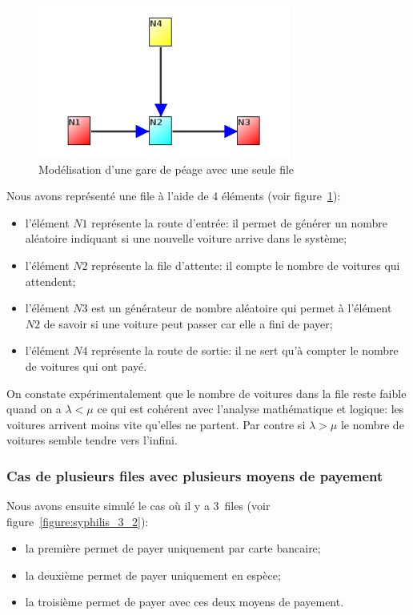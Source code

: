 \documentclass{scrartcl}
\begin{document}
      \begin{figure}[htbp]
        \centering
        \includegraphics[height=5cm]{img/poisson_simple.png}
        \caption{Modélisation d'une gare de péage avec une seule file}
        \label{figure:syphilis_simple}
      \end{figure}

      Nous avons représenté une file à l'aide de 4 éléments (voir
      figure~\ref{figure:syphilis_simple}):
      \begin{itemize}
        \item l'élément $N1$ représente la route d'entrée: il permet de générer
          un nombre aléatoire indiquant si une nouvelle voiture arrive dans le
          système;
        \item l'élément $N2$ représente la file d'attente: il compte le nombre
          de voitures qui attendent;
        \item l'élément $N3$ est un générateur de nombre aléatoire qui permet à
          l'élément $N2$ de savoir si une voiture peut passer car elle a fini
          de payer;
        \item l'élément $N4$ représente la route de sortie: il ne sert qu'à
          compter le nombre de voitures qui ont payé.
      \end{itemize}

      On constate expérimentalement que le nombre de voitures dans la file
      reste faible quand on a $\lambda < \mu$ ce qui est cohérent avec
      l'analyse mathématique et logique: les voitures arrivent moins vite
      qu'elles ne partent. Par contre si $\lambda > \mu$ le nombre de voitures
      semble tendre vers l'infini.

    \subsubsection{Cas de plusieurs files avec plusieurs moyens de payement}
      \label{sec:peage_anal}
      Nous avons ensuite simulé le cas où il y a 3~files (voir
      figure~\ref{figure:syphilis_3_2}):
      \begin{itemize}
        \item la première permet de payer uniquement par carte bancaire;
        \item la deuxième permet de payer uniquement en espèce;
        \item la troisième permet de payer avec ces deux moyens de payement.
      \end{itemize}
\end{document}
